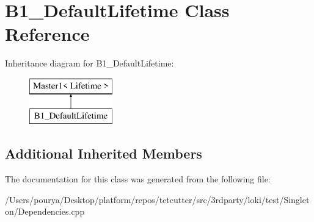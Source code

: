 \hypertarget{classB1__DefaultLifetime}{}\section{B1\+\_\+\+Default\+Lifetime Class Reference}
\label{classB1__DefaultLifetime}
Inheritance diagram for B1\+\_\+\+Default\+Lifetime\+:\begin{figure}[H]
\begin{center}
\leavevmode
\includegraphics[height=2.000000cm]{classB1__DefaultLifetime}
\end{center}
\end{figure}
\subsection*{Additional Inherited Members}


The documentation for this class was generated from the following file\+:\begin{DoxyCompactItemize}
\item 
/\+Users/pourya/\+Desktop/platform/repos/tetcutter/src/3rdparty/loki/test/\+Singleton/Dependencies.\+cpp\end{DoxyCompactItemize}
